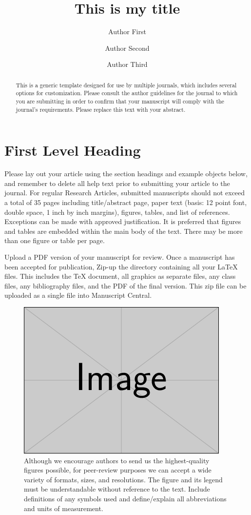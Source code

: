 \documentclass{wiley-article} %
\title{This is my title}
\author[1\authfn{1}]{Author First}
\author[2\authfn{1}]{Author Second}
\author[1\authfn{2}]{Author Third}
\affil[1]{Department, Institution, City, State or Province, Postal Code, Country}
\affil[2]{Department, Institution, City, State or Province, Postal Code, Country}
\begin{document}
\begin{frontmatter}
\maketitle

\begin{abstract}
This is a generic template designed for use by multiple journals, which includes several options for customization. Please consult the author guidelines for the journal to which you are submitting in order to confirm that your manuscript will comply with the journal's requirements. Please replace this text with your abstract.

\end{abstract}

\end{frontmatter}


\section{First Level Heading}\label{sec:intro}
Please lay out your article using the section headings and example objects below, and remember to delete all help text prior to submitting your article to the journal. For regular Research Articles, submitted manuscripts should not exceed a total of 35 pages including
title/abstract page, paper text (basis: 12 point font, double space, 1 inch by inch margins), figures, tables, and list of references. Exceptions can be made with approved justification. It is preferred that figures and tables are embedded within the main body of the text. There
may be more than one figure or table per page.

Upload a PDF version of your manuscript for review. Once a manuscript has been accepted for
publication, Zip-up the directory containing all your LaTeX files. This includes the TeX document, all graphics as separate files, any class files, any bibliography files, and the PDF of the final version. This zip file can be uploaded as a single file into Manuscript Central.

\begin{figure}
\centering
\includegraphics[width=0.3\linewidth]{example-image-rectangle}
\caption{Although we encourage authors to send us the highest-quality figures possible, for peer-review purposes we can accept a wide variety of formats, sizes, and resolutions. The figure and its legend must be understandable without reference to the text. Include definitions of any symbols used and define/explain all abbreviations and units of measurement.}
\label{fig: sample1}
\end{figure}
\end{document}
